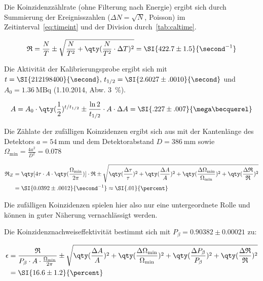 \documentclass[slug=PET, room=Andreas-Schubert-Bau\,\ 424A, supervisor=Carsten\ Bittrich, coursedate=10.\ 01.\ 2020]{../../Lab_Report_LaTeX/lab_report}
\begin{document}
Die Koinzidenzz\"ahlrate (ohne Filterung nach Energie) ergibt sich
durch Summierung der Ereignisszahlen (\(\Delta N = \sqrt{N}\),
Poisson) im Zeitinterval~\eqref{eq:timeint} und der Division
durch~\eqref{tab:caltime}.

\begin{equation}
  \label{eq:ctrate}
  \mathfrak{R} = \frac{N}{T} \pm \sqrt{\frac{N}{T^2} +
    \qty(\frac{N}{T^2}\cdot \Delta T)^2} = \SI{422.7\pm 1.5}{\second^{-1}}
\end{equation}

Die Aktivität der  Kalibrierungsprobe ergibt sich mit
\(t=\SI{212198400}{\second},\, t_{1/2} = \SI{2.6027\pm .0010}{\second}\) und \(A_0
= \SI{1.36}{\mega\becquerel}\) (1.10.2014, Abw. \SI{3}{\percent}).

\begin{equation}
  \label{eq:acttoday}
  A = A_0\cdot \qty(\frac{1}{2})^{t/t_{1/2}} \pm
  \frac{\ln{2}}{t_{1/2}}\cdot A\cdot\Delta A = \SI{.227\pm.007}{\mega\becquerel}
\end{equation}

Die Z\"ahlate der zuf\"alligen Koinzidenzen ergibt sich aus
mit der Kantenl\"ange des Detektors
\(a=\SI{54}{\milli\meter}\) und dem Detektorabstand
\(D=\SI{386}{\milli\meter}\) sowie
\(\Omega_{\min} = \frac{4a^2}{D^2} = 0.078\)

\begin{align}
  \label{eq:incidentalrate}
  \mathfrak{R}_Z &= \qty[4\tau\cdot A\cdot
  \qty(\frac{\Omega_{\min}}{2\pi})]\cdot \mathfrak{R} \pm
  \sqrt{\qty(\frac{\Delta\tau}{\tau})^2 + \qty(\frac{\Delta A}{A})^2 +
    \qty(\frac{\Delta\Omega_{\min}}{\Omega_{\min}})^2 +
                   \qty(\frac{\Delta\mathfrak{R}}{\mathfrak{R}})^2} \\
                 &= \SI{0.0392\pm .0012}{\second^{-1}} \approx \SI{.01}{\percent}
\end{align}

Die zuf\"alligen Koinzidenzen spielen hier also nur eine
untergeordnete Rolle und k\"onnen in guter N\"aherung vernachl\"assigt
werden.

Die Koinzidenznachweiseffektivit\"at bestimmt sich
mit \(P_\beta = 0.90382\pm 0.00021\) zu:

\begin{align}
  \epsilon & = \frac{\mathfrak{R}}{P_\beta\cdot A \cdot
  \frac{\Omega_{\min}}{2\pi}} \pm \sqrt{\qty(\frac{\Delta A}{A})^2 +
  \qty(\frac{\Delta\Omega_{\min}}{\Omega_{\min}})^2 +
  \qty(\frac{\Delta P_\beta}{P_\beta})^2 +
             \qty(\frac{\Delta\mathfrak{R}}{\mathfrak{R}})^2} \\
  & = \SI{16.6\pm 1.2}{\percent}
\end{align}
\end{document}
